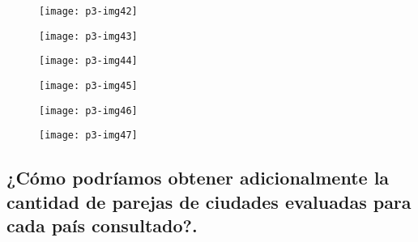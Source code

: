 \documentclass[10pt]{article}
\begin{document}
\begin{figure}[H]
	\begin{center}
 		\texttt{[image: p3-img42]}
	\end{center} 
\end{figure}

\begin{figure}[H]
	\begin{center}
 		\texttt{[image: p3-img43]}
	\end{center} 
\end{figure}

\begin{figure}[H]
	\begin{center}
 		\texttt{[image: p3-img44]}
	\end{center} 
\end{figure}

\begin{figure}[H]
	\begin{center}
 		\texttt{[image: p3-img45]}
	\end{center} 
\end{figure}

\begin{figure}[H]
	\begin{center}
 		\texttt{[image: p3-img46]}
	\end{center} 
\end{figure}

\begin{figure}[H]
	\begin{center}
 		\texttt{[image: p3-img47]}
	\end{center} 
\end{figure}


\subsection{¿Cómo podríamos obtener adicionalmente la cantidad de parejas de ciudades evaluadas para cada país consultado?.}
\end{document}

